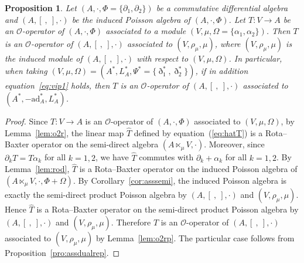\documentclass[10pt,a4paper]{amsart}
\numberwithin{equation}{section}
\newtheorem{Proposition}[Theorem]{Proposition}
{ \theoremstyle{definition}
	\newtheorem{Definition}[Theorem]{Definition}
	\newtheorem{Note}[Theorem]{Note}
	\newtheorem{Example}[Theorem]{Example}
	\newtheorem{Remark}[Theorem]{Remark} }
\newcommand{\ad}{\mathrm{ad}}
\begin{document}
\begin{Proposition}\label{pro:assopp}
 Let $(A, \cdot, \Phi = \{\partial_1, \partial_2\})$ be a commutative differential algebra and
 $(A, [\ ,\ ], \cdot)$ be the induced Poisson algebra of $(A, \cdot, \Phi)$.
 Let $T\colon V \to A$ be an $\mathcal{O}$-operator of $(A, \cdot, \Phi)$
 associated to a module $(V, \mu, \Omega = \{\alpha_1, \alpha_2\})$.
 Then $T$ is an $\mathcal{O}$-operator of $(A, [\ ,\ ], \cdot)$ associated to $(V, \rho_\mu, \mu)$,
 where $(V, \rho_\mu,\mu)$ is the induced module of $(A, [\ ,\ ], \cdot)$ with respect to $(V, \mu, \Omega)$.
 In particular, when taking $(V, \mu,\Omega) = (A^*, L_A^*, \Psi^*=\{\eth_1^*, \eth_2^*\})$,
 if in addition equation~\eqref{eq:vip1} holds, then $T$ is an $\mathcal{O}$-operator of $(A, [\ ,\ ], \cdot)$ associated to $(A^*, -\ad_A^* , L_A^*)$.
\end{Proposition}
\begin{proof}
 Since $T\colon V \to A$ is an $\mathcal{O}$-operator of $(A, \cdot, \Phi)$
 associated to $(V, \mu, \Omega)$, by Lemma~\ref{lem:o2r}, the linear map $\hat T$ defined by equation~(\ref{eq:hatT}) is a Rota--Baxter operator on the semi-direct algebra $(A \ltimes_\mu V, \cdot)$. Moreover, since $\partial_k T = T\alpha_k$ for all $k=1,2$, we have $\hat T$ commutes with $\partial_k + \alpha_k$ for all $k=1,2$.
 By Lemma~\ref{lem:rod}, $\hat T$ is a Rota--Baxter operator on the induced Poisson algebra of $(A \ltimes_\mu V, \cdot, \Phi + \Omega)$.
 By Corollary~\ref{cor:asssemi}, the induced Poisson algebra is exactly the semi-direct product Poisson algebra by $(A, [\ ,\ ], \cdot)$ and $(V, \rho_\mu, \mu)$. Hence $\hat T$ is a Rota--Baxter operator on the semi-direct product Poisson algebra by $(A, [\ ,\ ], \cdot)$ and $(V, \rho_\mu, \mu)$.
 Therefore $T$ is an $\mathcal{O}$-operator of $(A, [\ ,\ ], \cdot)$ associated to $(V, \rho_\mu, \mu)$ by Lemma~\ref{lem:o2rp}.
 The particular case follows from Proposition~\ref{pro:assdualrep}.
\end{proof}
\end{document}
